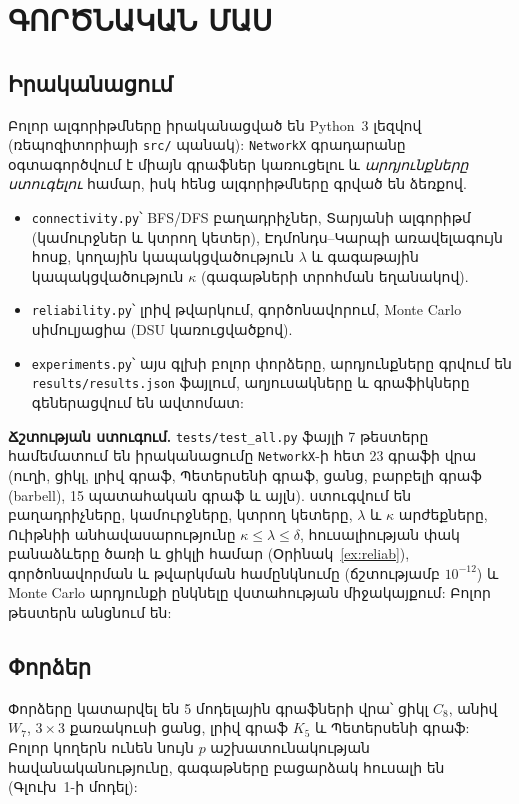 
\chapter{ԳՈՐԾՆԱԿԱՆ ՄԱՍ}

\section{Իրականացում}

Բոլոր ալգորիթմները իրականացված են Python~3 լեզվով (ռեպոզիտորիայի \texttt{src/} պանակ): \texttt{NetworkX} գրադարանը օգտագործվում է միայն գրաֆներ կառուցելու և \emph{արդյունքները ստուգելու} համար, իսկ հենց ալգորիթմները գրված են ձեռքով.
\begin{itemize}
  \item \texttt{connectivity.py}՝ BFS/DFS բաղադրիչներ, Տարյանի ալգորիթմ (կամուրջներ և կտրող կետեր), Էդմոնդս--Կարպի առավելագույն հոսք, կողային կապակցվածություն $\lambda$ և գագաթային կապակցվածություն $\kappa$ (գագաթների տրոհման եղանակով).
  \item \texttt{reliability.py}՝ լրիվ թվարկում, գործոնավորում, Monte Carlo սիմուլյացիա (DSU կառուցվածքով).
  \item \texttt{experiments.py}՝ այս գլխի բոլոր փորձերը, արդյունքները գրվում են \texttt{results/results.json} ֆայլում, աղյուսակները և գրաֆիկները գեներացվում են ավտոմատ:
\end{itemize}

\textbf{Ճշտության ստուգում.} \texttt{tests/test\_all.py} ֆայլի 7 թեստերը համեմատում են իրականացումը \texttt{NetworkX}-ի հետ 23 գրաֆի վրա (ուղի, ցիկլ, լրիվ գրաֆ, Պետերսենի գրաֆ, ցանց, բարբելի գրաֆ (barbell), 15 պատահական գրաֆ և այլն). ստուգվում են բաղադրիչները, կամուրջները, կտրող կետերը, $\lambda$ և $\kappa$ արժեքները, Ուիթնիի անհավասարությունը $\kappa\le\lambda\le\delta$, հուսալիության փակ բանաձևերը ծառի և ցիկլի համար (Օրինակ~\ref{ex:reliab}), գործոնավորման և թվարկման համընկնումը (ճշտությամբ $10^{-12}$) և Monte Carlo արդյունքի ընկնելը վստահության միջակայքում: Բոլոր թեստերն անցնում են:

\section{Փորձեր}

Փորձերը կատարվել են 5 մոդելային գրաֆների վրա՝ ցիկլ $C_8$, անիվ $W_7$, $3\times3$ քառակուսի ցանց, լրիվ գրաֆ $K_5$ և Պետերսենի գրաֆ: Բոլոր կողերն ունեն նույն $p$ աշխատունակության հավանականությունը, գագաթները բացարձակ հուսալի են (Գլուխ~1-ի մոդել):

